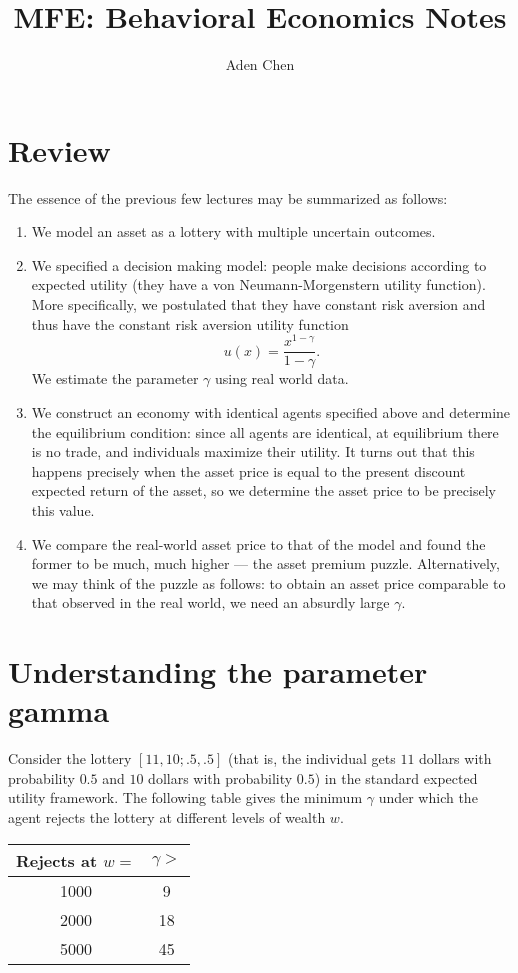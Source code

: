 \documentclass[oneside,reqno,letterpaper]{amsart}
\title[MFE: Behavioral Economics Notes]{MFE: Behavioral Economics Notes}
\author{Aden Chen}
\begin{document}
\maketitle
\tableofcontents

\section{Review}
The essence of the previous few lectures may be summarized as follows:
\begin{enumerate}[label=(\roman*)]
  \item We model an asset as a lottery with multiple uncertain outcomes.
  \item We specified a decision making model: people make decisions according to expected utility (they have a von Neumann-Morgenstern utility function). 
    More specifically, we postulated that they have constant risk aversion and thus have the constant risk aversion utility function
    \[
      u(x) = \frac{x^{1 - \gamma}}{1 - \gamma}.
    \] 
    We estimate the parameter \(\gamma\) using real world data.
  \item We construct an economy with identical agents specified above and determine the equilibrium condition: since all agents are identical, at equilibrium there is no trade, and individuals maximize their utility.
    It turns out that this happens precisely when the asset price is equal to the present discount expected return of the asset, so we determine the asset price to be precisely this value.
  \item We compare the real-world asset price to that of the model and found the former to be much, much higher --- the asset premium puzzle.
    Alternatively, we may think of the puzzle as follows:
    to obtain an asset price comparable to that observed in the real world, we need an absurdly large \(\gamma\).
\end{enumerate}


\section{Understanding the parameter gamma}
Consider the lottery \([11, 10; .5, .5]\) (that is, the individual gets \(11\) dollars with probability \(0.5\) and \(10\) dollars with probability \(0.5\)) in the standard expected utility framework.
The following table gives the minimum \(\gamma\) under which the agent rejects the lottery at different levels of wealth \(w\).

\begin{table}[H]
\centering
\begin{tabular}{ c c } 
  Rejects at \(w=\) & \(\gamma > \) \\ 
\hline
  \num{1000} & 9 \\ 
  \num{2000} & 18 \\ 
  \num{5000} & 45 \\ 
\end{tabular}
\end{table}
\end{document}
